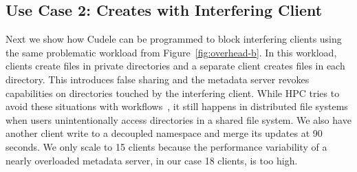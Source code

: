 %
%
%
%
%
%
%
%
%
%
%

\subsection{Use Case 2: Creates with Interfering Client}

Next we show how Cudele can be programmed to block interfering clients using
the same problematic workload from Figure~\ref{fig:overhead-b}. In this
workload, clients create files in private directories and a separate client
creates files in each directory. This introduces false sharing and the metadata
server revokes capabilities on directories touched by the interfering client. While
HPC tries to avoid these situations with
workflows~\cite{zheng:pdsw2014-batchfs, zheng:pdsw2015-deltafs}, it still
happens in distributed file systems when users unintentionally access
directories in a shared file system.  We also have another client write to a
decoupled namespace and merge its updates at 90 seconds.  We only scale to 15
clients because the performance variability of a nearly overloaded metadata
server, in our case 18 clients, is too high.

